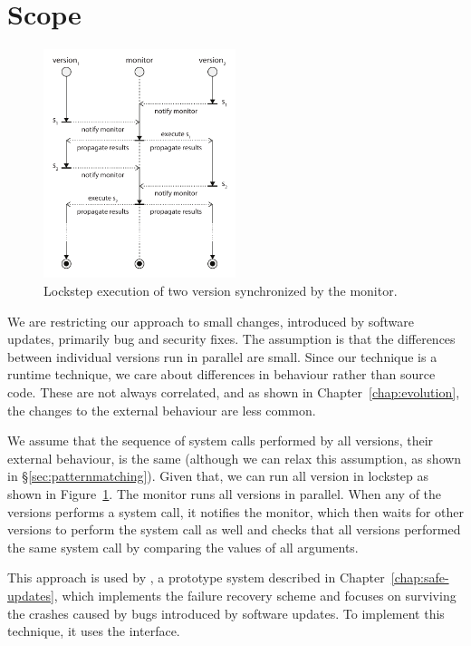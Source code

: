 \section{Scope}
\label{multi-version:scope}

\begin{figure}[t]
  \begin{center}
    \includegraphics[width=0.5\textwidth]{multi-version/figures/lockstep}
    \caption{Lockstep execution of two version synchronized by the monitor.}
    \label{fig:lockstep-execution}
  \end{center}
\end{figure}

We are restricting our approach to small changes, introduced by software
updates, primarily bug and security fixes. The assumption is that the differences
between individual versions run in parallel are small. Since our technique
is a runtime technique, we care about differences in behaviour rather than
source code. These are not always correlated, and as shown in
Chapter~\ref{chap:evolution}, the changes to the external behaviour are less
common.

We assume that the sequence of system calls performed by all versions, \ie
their external behaviour, is the same (although we can relax this assumption,
as shown in \S\ref{sec:patternmatching}). Given that, we can run all version in
lockstep as shown in Figure~\ref{fig:lockstep-execution}.  The monitor runs all
versions in parallel. When any of the versions performs a system call, it
notifies the monitor, which then waits for other versions to perform the system
call as well and checks that all versions performed the same system call by
comparing the values of all arguments.

This approach is used by \mx, a prototype system described in
Chapter~\ref{chap:safe-updates}, which implements the failure recovery scheme
and focuses on surviving the crashes caused by bugs introduced by software
updates. To implement this technique, it uses the \ptrace interface.

